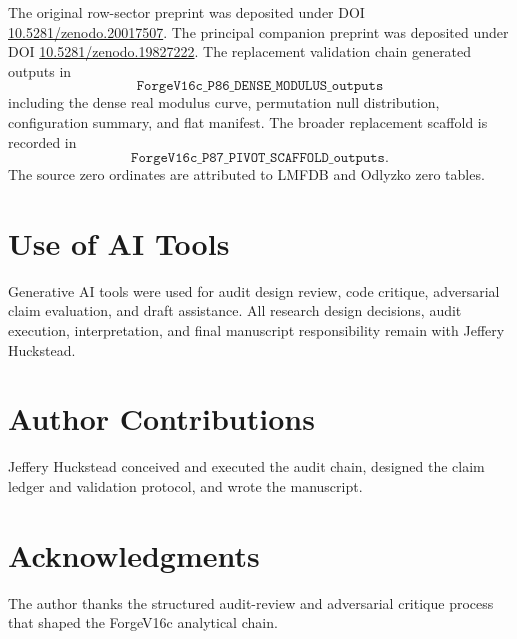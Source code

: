 \documentclass[11pt]{article}
\newcommand{\principaldoi}{10.5281/zenodo.19827222}
\newcommand{\paperdoi}{10.5281/zenodo.20017507}
\begin{document}
The original row-sector preprint was deposited under DOI
\href{https://doi.org/\paperdoi}{\paperdoi}. The principal companion preprint was deposited under DOI
\href{https://doi.org/\principaldoi}{\principaldoi}. The replacement validation chain generated outputs in
\[
\texttt{ForgeV16c\_P86\_DENSE\_MODULUS\_outputs}
\]
including the dense real modulus curve, permutation null distribution, configuration summary, and flat manifest. The broader replacement scaffold is recorded in
\[
\texttt{ForgeV16c\_P87\_PIVOT\_SCAFFOLD\_outputs}.
\]
The source zero ordinates are attributed to LMFDB and Odlyzko zero tables.

\section*{Use of AI Tools}

Generative AI tools were used for audit design review, code critique, adversarial claim evaluation, and draft assistance. All research design decisions, audit execution, interpretation, and final manuscript responsibility remain with Jeffery Huckstead.

\section*{Author Contributions}

Jeffery Huckstead conceived and executed the audit chain, designed the claim ledger and validation protocol, and wrote the manuscript.

\section*{Acknowledgments}

The author thanks the structured audit-review and adversarial critique process that shaped the ForgeV16c analytical chain.
\end{document}
